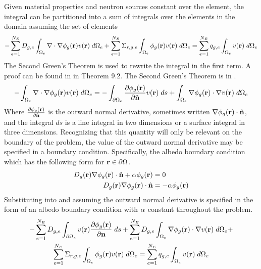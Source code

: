     Given material properties and neutron sources constant over the element, 
    the integral can be partitioned into a sum of integrals over the 
    elements in the domain assuming the set of elements 
    \begin{equation} \label{eq:element_by_element}
      -\sum_{e=1}^{N_E} D_{g,e} 
        \int_{\Omega_e} \mathbf{\nabla} \cdot \mathbf{\nabla} \phi_g(\mathbf{r}) v(\mathbf{r}) \; d\Omega_e +
        \sum_{e=1}^{N_E} \Sigma_{r,g,e} \int_{\Omega_e} \phi_g(\mathbf{r}) v(\mathbf{r}) 
        \;d\Omega_e = \sum_{e=1}^{N_E} q_{g,e} \int_{\Omega_e} v(\mathbf{r}) 
        \; d\Omega_e
    \end{equation}
    The Second Green's Theorem is used to rewrite the integral in the first
    term. A proof can be found in \cite{textbookli} in Theorem 9.2. The Second 
    Green's Theorem is in .
    \begin{equation} \label{eq:greens}
      -\int_{\Omega_e} \mathbf{\nabla} \cdot \mathbf{\nabla} \phi_g(\mathbf{r}) v(\mathbf{r}) \;d\Omega_e =
        -\int_{\partial \Omega_e}  
        \frac{\partial \phi_g(\mathbf{r})}{\partial \hat{\mathbf{n}}} v(\mathbf{r})\; ds +
        \int_{\Omega_e} \mathbf{\nabla} \phi_g(\mathbf{r}) \cdot \mathbf{\nabla} v(\mathbf{r}) \; d\Omega_e
    \end{equation}
    Where $\frac{\partial \phi_g(\mathbf{r})}{\partial \hat{\mathbf{n}}}$ is the outward normal 
    derivative, sometimes written $\mathbf{\nabla} \phi_g(\mathbf{r}) \cdot \hat{\mathbf{n}}$, and the 
    integral $ds$ is a line integral in two dimensions or a surface integral in 
    three dimensions. Recognizing that this quantity will only be relevant on 
    the boundary of the problem, the value of the outward normal derivative may 
    be specified in a boundary condition. Specifically, the albedo boundary 
    condition which has the following form for $\mathbf{r} \in \partial \Omega$. 
    \begin{align}
      D_g(\mathbf{r}) \mathbf{\nabla} \phi_g(\mathbf{r}) \cdot \hat{\mathbf{n}} + \alpha \phi_g(\mathbf{r}) &= 0 \\
      D_g(\mathbf{r}) \mathbf{\nabla} \phi_g(\mathbf{r}) \cdot \hat{\mathbf{n}} &= -\alpha \phi_g(\mathbf{r})
    \end{align}
    Substituting  into   and 
    assuming the outward normal derivative is specified in the form of an albedo
    boundary condition with $\alpha$ constant throughout the problem.
    \begin{multline} 
      -\sum_{e=1}^{N_E} D_{g,e} \int_{\partial \Omega_e} v(\mathbf{r}) 
        \frac{\partial \phi_g(\mathbf{r})}{\partial \mathbf{n}} \;ds + \sum_{e=1}^{N_E} D_{g,e}
        \int_{\Omega_e} \mathbf{\nabla} \phi_g(\mathbf{r}) \cdot \mathbf{\nabla} v(\mathbf{r}) \; d\Omega_e + \\
        \sum_{e=1}^{N_E} \Sigma_{r,g,e} \int_{\Omega_e} \phi_g(\mathbf{r}) v(\mathbf{r}) 
        \; d\Omega_e =
        \sum_{e=1}^{N_E} q_{g,e} \int_{\Omega_e} v(\mathbf{r}) \; d\Omega_e
    \end{multline}
